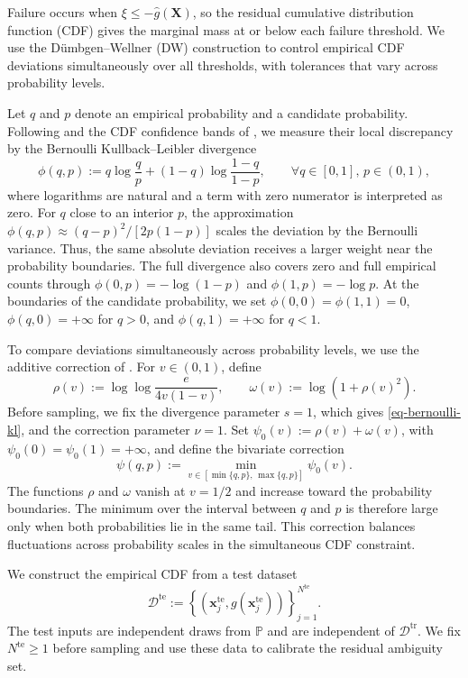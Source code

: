 \documentclass[review,11pt,3p,authoryear,nopreprintline]{elsarticle}
\begin{document}
Failure occurs when $\xi\le-\hat g(\bm X)$, so the residual cumulative distribution function (CDF) gives the marginal mass at or below each failure threshold. We use the D\"umbgen--Wellner (DW) construction \citep{L.J23} to control empirical CDF deviations simultaneously over all thresholds, with tolerances that vary across probability levels.

Let $q$ and $p$ denote an empirical probability and a candidate probability. Following \citet{B.J79} and the CDF confidence bands of \citet{O95}, we measure their local discrepancy by the Bernoulli Kullback--Leibler divergence
\begin{equation}
  \phi(q,p):=q\log\frac{q}{p}+(1-q)\log\frac{1-q}{1-p},\qquad \forall q\in[0,1],\, p\in(0,1),
  \label{eq-bernoulli-kl}
\end{equation}
where logarithms are natural and a term with zero numerator is interpreted as zero. For $q$ close to an interior $p$, the approximation $\phi(q,p)\approx(q-p)^2/[2p(1-p)]$ scales the deviation by the Bernoulli variance. Thus, the same absolute deviation receives a larger weight near the probability boundaries. The full divergence also covers zero and full empirical counts through $\phi(0,p)=-\log(1-p)$ and $\phi(1,p)=-\log p$. At the boundaries of the candidate probability, we set $\phi(0,0)=\phi(1,1)=0$, $\phi(q,0)=+\infty$ for $q>0$, and $\phi(q,1)=+\infty$ for $q<1$.

To compare deviations simultaneously across probability levels, we use the additive correction of \citet{L.J23}. For $v\in(0,1)$, define
\begin{equation*}
  \rho(v):=\log\log\frac{e}{4v(1-v)},\qquad \omega(v):=\log\!\left(1+\rho(v)^2\right).
\end{equation*}
Before sampling, we fix the divergence parameter $s=1$, which gives \eqref{eq-bernoulli-kl}, and the correction parameter $\nu=1$. Set $\psi_0(v):=\rho(v)+\omega(v)$, with $\psi_0(0)=\psi_0(1)=+\infty$, and define the bivariate correction
\begin{equation*}
  \psi(q,p):=\min_{v\in[\min\{q,p\},\,\max\{q,p\}]}\psi_0(v).
\end{equation*}
The functions $\rho$ and $\omega$ vanish at $v=1/2$ and increase toward the probability boundaries. The minimum over the interval between $q$ and $p$ is therefore large only when both probabilities lie in the same tail. This correction balances fluctuations across probability scales in the simultaneous CDF constraint.

We construct the empirical CDF from a test dataset
\[
  \mathcal D^{\mathrm{te}}:=\left\{\left(\bm x_j^{\mathrm{te}},g(\bm x_j^{\mathrm{te}})\right)\right\}_{j=1}^{N^{\mathrm{te}}}.
\]
The test inputs are independent draws from $\mathbb P$ and are independent of $\mathcal D^{\mathrm{tr}}$. We fix $N^{\mathrm{te}}\ge1$ before sampling and use these data to calibrate the residual ambiguity set.
\end{document}
